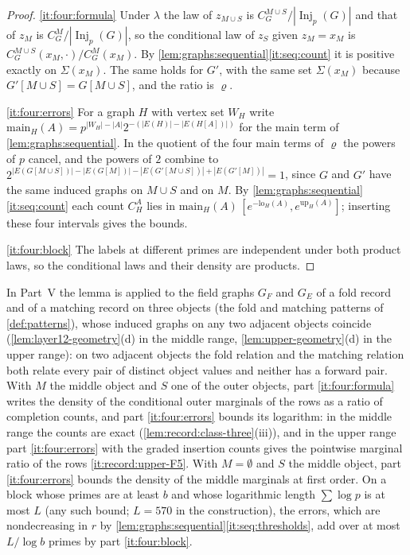 \begin{proof}
\ref{it:four:formula} Under $\lambda$ the law of $z_{M\cup S}$ is
$C_G^{M\cup S}/|\operatorname{Inj}_p(G)|$ and that of $z_M$ is
$C_G^M/|\operatorname{Inj}_p(G)|$, so the conditional law of $z_S$ given $z_M=x_M$
is $C_G^{M\cup S}(x_M,\cdot)/C_G^M(x_M)$. By \cref{lem:graphs:sequential}\ref{it:seq:count}
it is positive exactly on $\Sigma(x_M)$. The same holds for $G'$, with the same
set $\Sigma(x_M)$ because $G'[M\cup S]=G[M\cup S]$, and the ratio is $\varrho$.

\ref{it:four:errors} For a graph $H$ with vertex set $W_H$ write
$\mathrm{main}_H(A)=p^{|W_H|-|A|}2^{-(|E(H)|-|E(H[A])|)}$ for the main term of
\cref{lem:graphs:sequential}. In the quotient of the four main terms of $\varrho$
the powers of $p$ cancel, and the powers of $2$ combine to
$2^{|E(G[M\cup S])|-|E(G[M])|-|E(G'[M\cup S])|+|E(G'[M])|}=1$, since $G$ and $G'$
have the same induced graphs on $M\cup S$ and on $M$. By
\cref{lem:graphs:sequential}\ref{it:seq:count} each count $C_H^A$ lies in
$\mathrm{main}_H(A)\,[e^{-\mathrm{lo}_H(A)},e^{\mathrm{up}_H(A)}]$; inserting
these four intervals gives the bounds.

\ref{it:four:block} The labels at different primes are independent under both
product laws, so the conditional laws and their density are products.
\end{proof}

In Part~V the lemma is applied to the field graphs $G_F$ and $G_E$ of a fold
record and of a matching record on three objects (the fold and matching patterns of \cref{def:patterns}), whose induced graphs on any
two adjacent objects coincide (\cref{lem:layer12-geometry}(d) in the middle
range, \cref{lem:upper-geometry}(d) in the upper range): on two adjacent
objects the fold relation and the matching relation both relate every pair of
distinct object values and neither has a forward pair. With $M$ the middle
object and $S$ one of the outer objects, part \ref{it:four:formula} writes the
density of the conditional outer marginals of the rows as a ratio of
completion counts, and part \ref{it:four:errors} bounds its logarithm: in the
middle range the counts are exact (\cref{lem:record:class-three}(iii)), and in
the upper range part \ref{it:four:errors} with the graded insertion counts gives
the pointwise marginal ratio of the rows \ref{it:record:upper-F5}. With
$M=\emptyset$ and $S$ the middle object, part \ref{it:four:errors} bounds the
density of the middle marginals at first order. On a block whose primes are at
least $b$ and whose logarithmic length $\sum\log p$ is at most
$L$ (any such bound; $L=570$ in the construction), the errors,
which are
nondecreasing in $r$ by \cref{lem:graphs:sequential}\ref{it:seq:thresholds}, add
over at most $L/\log b$ primes by part \ref{it:four:block}.

